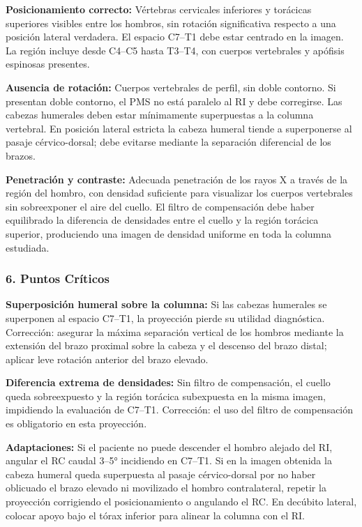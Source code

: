 		\textbf{Posicionamiento correcto:} Vértebras cervicales inferiores y torácicas superiores visibles entre los hombros, sin rotación significativa respecto a una posición lateral verdadera. El espacio C7--T1 debe estar centrado en la imagen. La región incluye desde C4--C5 hasta T3--T4, con cuerpos vertebrales y apófisis espinosas presentes.
		
		\textbf{Ausencia de rotación:} Cuerpos vertebrales de perfil, sin doble contorno. Si presentan doble contorno, el PMS no está paralelo al RI y debe corregirse. Las cabezas humerales deben estar mínimamente superpuestas a la columna vertebral. En posición lateral estricta la cabeza humeral tiende a superponerse al pasaje cérvico-dorsal; debe evitarse mediante la separación diferencial de los brazos.
		
		\textbf{Penetración y contraste:} Adecuada penetración de los rayos X a través de la región del hombro, con densidad suficiente para visualizar los cuerpos vertebrales sin sobreexponer el aire del cuello. El filtro de compensación debe haber equilibrado la diferencia de densidades entre el cuello y la región torácica superior, produciendo una imagen de densidad uniforme en toda la columna estudiada.
		
		\subsubsection*{6. Puntos Críticos}
		
		\textbf{Superposición humeral sobre la columna:} Si las cabezas humerales se superponen al espacio C7--T1, la proyección pierde su utilidad diagnóstica. Corrección: asegurar la máxima separación vertical de los hombros mediante la extensión del brazo proximal sobre la cabeza y el descenso del brazo distal; aplicar leve rotación anterior del brazo elevado.
		
		\textbf{Diferencia extrema de densidades:} Sin filtro de compensación, el cuello queda sobreexpuesto y la región torácica subexpuesta en la misma imagen, impidiendo la evaluación de C7--T1. Corrección: el uso del filtro de compensación es obligatorio en esta proyección.
		
		\textbf{Adaptaciones:} Si el paciente no puede descender el hombro alejado del RI, angular el RC caudal 3--5° incidiendo en C7--T1. Si en la imagen obtenida la cabeza humeral queda superpuesta al pasaje cérvico-dorsal por no haber oblicuado el brazo elevado ni movilizado el hombro contralateral, repetir la proyección corrigiendo el posicionamiento o angulando el RC. En decúbito lateral, colocar apoyo bajo el tórax inferior para alinear la columna con el RI.
		
